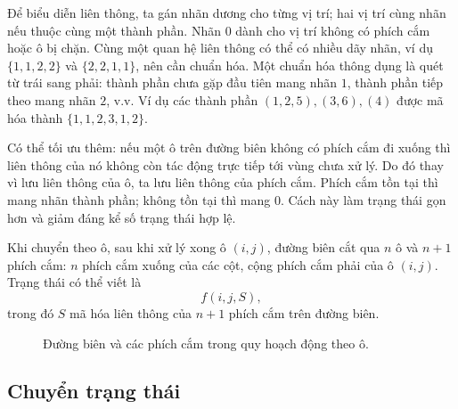 \documentclass[11pt]{article}
\begin{document}
Để biểu diễn liên thông, ta gán nhãn dương cho từng vị trí; hai vị trí cùng
nhãn nếu thuộc cùng một thành phần. Nhãn \(0\) dành cho vị trí không có phích
cắm hoặc ô bị chặn. Cùng một quan hệ liên thông có thể có nhiều dãy nhãn, ví
dụ \(\{1,1,2,2\}\) và \(\{2,2,1,1\}\), nên cần chuẩn hóa. Một chuẩn hóa thông
dụng là quét từ trái sang phải: thành phần chưa gặp đầu tiên mang nhãn \(1\),
thành phần tiếp theo mang nhãn \(2\), v.v. Ví dụ các thành phần
\((1,2,5),(3,6),(4)\) được mã hóa thành \(\{1,1,2,3,1,2\}\).

Có thể tối ưu thêm: nếu một ô trên đường biên không có phích cắm đi xuống thì
liên thông của nó không còn tác động trực tiếp tới vùng chưa xử lý. Do đó thay
vì lưu liên thông của ô, ta lưu liên thông của phích cắm. Phích cắm tồn tại
thì mang nhãn thành phần; không tồn tại thì mang \(0\). Cách này làm trạng thái
gọn hơn và giảm đáng kể số trạng thái hợp lệ.

Khi chuyển theo ô, sau khi xử lý xong ô \((i,j)\), đường biên cắt qua \(n\)
ô và \(n+1\) phích cắm: \(n\) phích cắm xuống của các cột, cộng phích cắm phải
của ô \((i,j)\). Trạng thái có thể viết là
\[
  f(i,j,S),
\]
trong đó \(S\) mã hóa liên thông của \(n+1\) phích cắm trên đường biên.

\begin{figure}[ht]
\centering
{}
\caption{Đường biên và các phích cắm trong quy hoạch động theo ô.}
\end{figure}

\subsection{Chuyển trạng thái}
\end{document}
